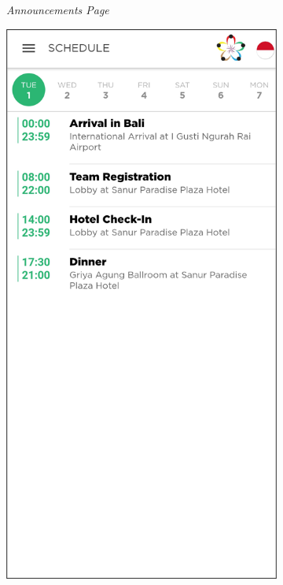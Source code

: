 \begin{figure}[H]
\begin{subfigure}[b]{0.24\textwidth}
	    \caption{\textit{Announcements Page}}
	    \label{fig:wsdcAppAnnouncements}
     \end{subfigure}
	\begin{subfigure}[b]{0.24\textwidth}
    \centering
	    \includegraphics[scale=0.37]{Gambar/SchedulePage.png}

\end{subfigure}
\end{figure}
